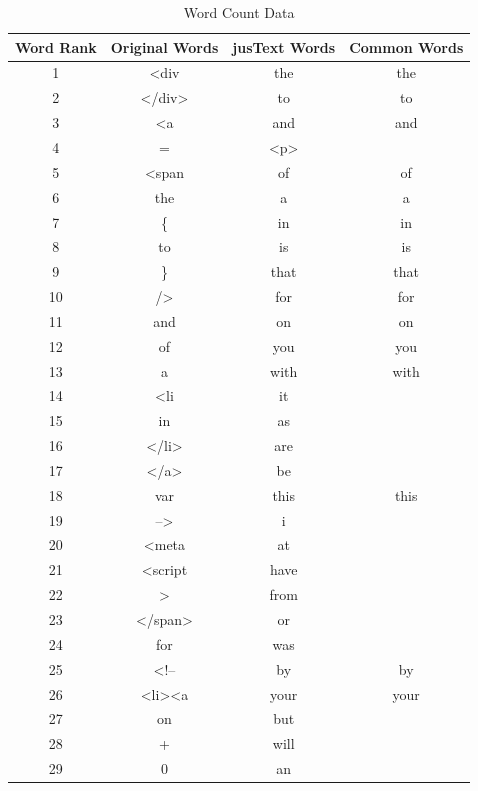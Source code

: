 \documentclass[a4paper,12pt]{article}
\begin{document}
{\renewcommand{\arraystretch}{0.93}
\begin{table}[H]
\centering
\small
\caption{Word Count Data}
\begin{tabular}{ | c | c | c | c | }
\hline
\textbf{Word Rank} & \textbf{Original Words} & \textbf{jusText Words} & \textbf{Common Words} \\ \hline
1 & \textless{}div & the & the \\ \hline
2 & \textless{}/div\textgreater{} & to & to \\ \hline
3 & \textless{}a & and & and \\ \hline
4 & = & \textless{}p\textgreater{} & \\ \hline
5 & \textless{}span & of & of \\ \hline
6 & the & a & a \\ \hline
7 & \{ & in & in \\ \hline
8 & to & is & is \\ \hline
9 & \} & that & that \\ \hline
10 & /\textgreater{} & for & for \\ \hline
11 & and & on & on \\ \hline
12 & of & you & you \\ \hline
13 & a & with & with \\ \hline
14 & \textless{}li & it & \\ \hline
15 & in & as & \\ \hline
16 & \textless{}/li\textgreater{} & are & \\ \hline
17 & \textless{}/a\textgreater{} & be & \\ \hline
18 & var & this & this \\ \hline
19 & --\textgreater{} & i & \\ \hline
20 & \textless{}meta & at & \\ \hline
21 & \textless{}script & have & \\ \hline
22 & \textgreater{} & from & \\ \hline
23 & \textless{}/span\textgreater{} & or & \\ \hline
24 & for & was & \\ \hline
25 & \textless{}!-- & by & by \\ \hline
26 & \textless{}li\textgreater{}\textless{}a & your & your \\ \hline
27 & on & but & \\ \hline
28 & + & will & \\ \hline
29 & 0 & an & \\ \hline

\end{tabular}
\end{table}}
\end{document}
